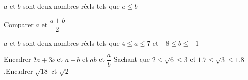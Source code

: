 \documentclass[a4paper,addpoints,12pt]{exam}
\begin{document}
\devoir[prv=false,ds=true,num=2 ,niv=3 , date=12/12/2022 ]
\begin{exo}[3]
\begin{minipage}{.5\linewidth}
$a$ et $b$ sont deux nombres réels tels que $a\leq b$

Comparer $a$ et $\dfrac{a+b}{2}$
\end{minipage}
\begin{minipage}{.5\linewidth}
\end{minipage}
\end{exo}

\begin{exo}[8]
$a$ et $b$ sont deux nombres réels tels que $4\leq a\leq 7$ et $-8\leq b\leq -1$
\begin{questions}
\question Encadrer $2a+3b$ et $a-b$ et $ab$ et $\dfrac{a}{b}$
\question Sachant que $2\leq \sqrt{6}\leq 3$ et $1.7\leq \sqrt{3}\leq 1.8$.Encadrer $\sqrt{18}$ et $\sqrt{2}$
\end{questions}
\end{exo}
\end{document}
